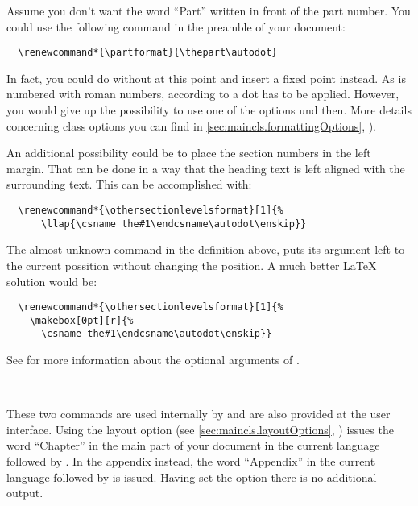 \begin{Example}
  Assume you don't want the word ``Part'' written in front of the part number.
  You could use the following command in the preamble of your document:
\begin{lstlisting}
  \renewcommand*{\partformat}{\thepart\autodot}
\end{lstlisting}
  In fact, you could do without  at this point and insert
  a fixed point instead. As  is numbered with roman numbers,
  according to \cite{DUDEN} a dot has to be applied. However, you would
  give up the possibility to use one of the options
   und  then. More
  details concerning class options you can find in
  \autoref{sec:maincls.formattingOptions},
  ).
  
  An additional possibility could be to place the section numbers
  in the left margin. That can be done in a way that the heading
  text is left aligned with the surrounding text.
  This can be accomplished with:
\begin{lstlisting}
  \renewcommand*{\othersectionlevelsformat}[1]{%
      \llap{\csname the#1\endcsname\autodot\enskip}}
\end{lstlisting}
  The almost unknown command  in the definition above,
  puts its argument left to the current possition without changing the
  position. A much better \LaTeX{} solution would be:
\begin{lstlisting}
  \renewcommand*{\othersectionlevelsformat}[1]{%
    \makebox[0pt][r]{%
      \csname the#1\endcsname\autodot\enskip}}
\end{lstlisting}
  See \cite{latex:usrguide} for more information about the optional arguments
  of .
\end{Example}
%
%
%
%
%


\begin{Declaration}
  \\
\end{Declaration}%
%
%
These%
 two commands
are used internally by {\KOMAScript} and are also provided at the user
interface. Using the layout option  (see
\autoref{sec:maincls.layoutOptions},
)
 issues the word
``Chapter'' in the main part of your document in the
current language followed by . In the
appendix instead, the word ``Appendix'' in the current
language followed by  is issued. Having set the
option  there is no additional output.

